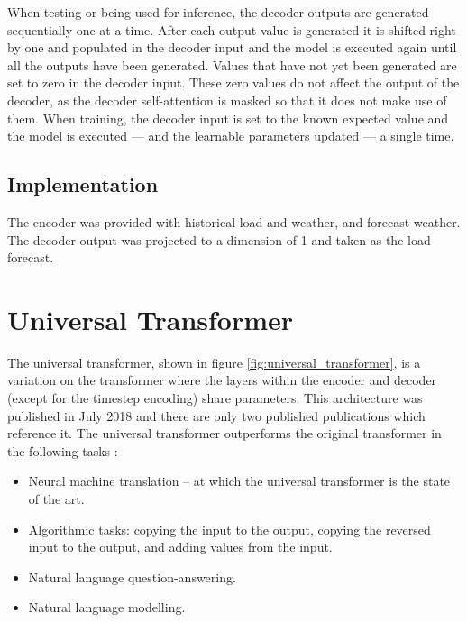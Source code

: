 When testing or being used for inference, the decoder outputs are generated sequentially one at a time.
After each output value is generated it is shifted right by one and populated in the decoder input and the model is executed again until all the outputs have been generated.
Values that have not yet been generated are set to zero in the decoder input.
These zero values do not affect the output of the decoder, as the decoder self-attention is masked so that it does not make use of them.
When training, the decoder input is set to the known expected value and the model is executed --- and the learnable parameters updated --- a single time.

\subsection{Implementation}
The encoder was provided with historical load and weather, and forecast weather.
The decoder output was projected to a dimension of 1 and taken as the load forecast.

\section{Universal Transformer} \label{sec:universal_transformer}
The universal transformer, shown in figure \ref{fig:universal_transformer}, is a variation on the transformer where the layers within the encoder and decoder (except for the timestep encoding) share parameters.
This architecture was published in July 2018 \cite{Dehghani2018} and there are only two published publications which reference it.
The universal transformer outperforms the original transformer in the following tasks \cite{Dehghani2018}:
\begin{itemize}
	\item Neural machine translation -- at which the universal transformer is the state of the art.
	\item Algorithmic tasks: copying the input to the output, copying the reversed input to the output, and adding values from the input.
	\item Natural language question-answering.
	\item Natural language modelling.
\end{itemize}

